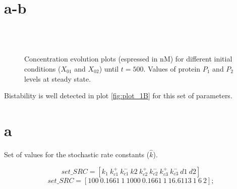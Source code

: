 \newcommand{\package}{\emph}

\setcounter{chapter}{1}
\setcounter{section}{0}

\section{a-b}


\begin{figure}[h!]
  \centering 
   ~ 
   \\
   ~~~~~~~~~~~~~~~~~~~~~~~~~~~~~~
  \caption{Concentration evolution plots (espressed in nM) for different
  initial conditions ($X_{01}$ and $X_{02}$) until $t=500$. Values of protein
  $P_1$ and $P_2$ levels at steady state.}
  \label{fig:plot_tab_det_c01}
\end{figure}

Bistability is well detected in plot \ref{fig:plot_1B} for this set of
parameters.

\setcounter{chapter}{2}
\setcounter{section}{0}
\section{a}
Set of values for the stochastic rate constants ($\hat{k}$).

\begin{equation}
set\_SRC = [k_1~k_{c1}^+~k_{c1}^-~k2~k_{c2}^+~k_{c2}^-~k_{c3}^+~k_{c3}^-~d1~d2]  
\end{equation}
\begin{equation}
set\_SRC = [100~0.1661~1~1000~0.1661~1~16.6113~1~6~2];
\end{equation}

